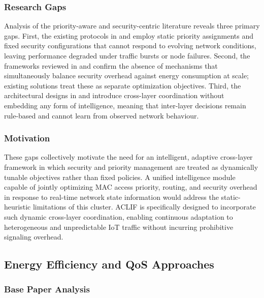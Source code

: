 \documentclass[a4paper]{cas-dc}
\numberwithin{equation}{section}
\begin{document}
\subsubsection*{Research Gaps}

Analysis of the priority-aware and security-centric literature reveals three primary gaps. First, the existing protocols in \cite{Nitya20261578} and \cite{Hamrioui2026} employ static priority assignments and fixed security configurations that cannot respond to evolving network conditions, leaving performance degraded under traffic bursts or node failures. Second, the frameworks reviewed in \cite{De2025} and \cite{Khamzaev2025498} confirm the absence of mechanisms that simultaneously balance security overhead against energy consumption at scale; existing solutions treat these as separate optimization objectives. Third, the architectural designs in \cite{Han2013622} and \cite{Resner201824} introduce cross-layer coordination without embedding any form of intelligence, meaning that inter-layer decisions remain rule-based and cannot learn from observed network behaviour.

\subsubsection*{Motivation}

These gaps collectively motivate the need for an intelligent, adaptive cross-layer framework in which security and priority management are treated as dynamically tunable objectives rather than fixed policies. A unified intelligence module capable of jointly optimizing MAC access priority, routing, and security overhead in response to real-time network state information would address the static-heuristic limitations of this cluster. ACLIF is specifically designed to incorporate such dynamic cross-layer coordination, enabling continuous adaptation to heterogeneous and unpredictable IoT traffic without incurring prohibitive signaling overhead.

\subsection{Energy Efficiency and QoS Approaches}

\subsubsection*{Base Paper Analysis}
\end{document}
